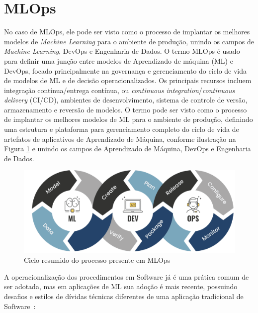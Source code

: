 \documentclass[portugues]{ic-tese}
\begin{document}
\section{MLOps}
\label{sec:MLOps}


No caso de MLOps, ele pode ser visto como o processo de implantar os melhores modelos de \textit{Machine Learning} para o ambiente de produção, unindo os campos de \textit{Machine Learning}, DevOps e Engenharia de Dados. 
O termo MLOps é usado para definir uma junção entre modelos de Aprendizado de máquina (ML) e DevOps, focado principalmente na governança e gerenciamento do ciclo de vida de modelos de ML e de decisão operacionalizados. Os principais recursos incluem integração contínua/entrega contínua, ou \textit{continuous integration}/\textit{continuous delivery} (CI/CD), ambientes de desenvolvimento, sistema de controle de versão, armazenamento e reversão de modelos. O termo pode ser visto como o processo de implantar os melhores modelos de ML para o ambiente de produção, definindo uma estrutura e plataforma para gerenciamento completo do ciclo de vida de artefatos de aplicativos de Aprendizado de Máquina, conforme ilustração na Figura \ref{fig:MLOpsLoop} e unindo os campos de Aprendizado de Máquina, DevOps e Engenharia de Dados.

\begin{figure}[H]
\centering
\includegraphics[scale=0.7]{images/code-validate-deploy-loop.png}
\caption {Ciclo resumido do processo presente em MLOps~\citep{Tripathi_2021}}
\label{fig:MLOpsLoop}
\end{figure}

A operacionalização dos procedimentos em Software já é uma prática comum de ser adotada, mas em aplicações de ML sua adoção é mais recente, possuindo desafios e estilos de dívidas técnicas diferentes de uma aplicação tradicional de Software~\cite{Sculley_2015}:
\end{document}
